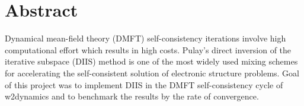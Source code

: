 \chapter*{Abstract}
\label{ch:abstract}

Dynamical mean-field theory (DMFT) self-consistency iterations involve high computational effort which results in high costs. Pulay's direct inversion of the iterative subspace (DIIS) method is one of the most widely used mixing schemes for accelerating the self-consistent solution of electronic structure problems. Goal of this project was to implement DIIS in the DMFT self-consistency cycle of w2dynamics and to benchmark the results by the rate of convergence.

